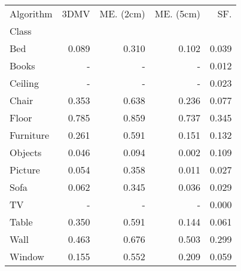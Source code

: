 \begin{tabular}{lrrrr}
\toprule
Algorithm &  3DMV &  ME. (2cm) &  ME. (5cm) &  SF. \\
Class     &       &                    &                    &                 \\
\midrule
Bed       & 0.089 &              0.310 &              0.102 &           0.039 \\
Books     &   - &                - &                - &           0.012 \\
Ceiling   &   - &                - &                - &           0.023 \\
Chair     & 0.353 &              0.638 &              0.236 &           0.077 \\
Floor     & 0.785 &              0.859 &              0.737 &           0.345 \\
Furniture & 0.261 &              0.591 &              0.151 &           0.132 \\
Objects   & 0.046 &              0.094 &              0.002 &           0.109 \\
Picture   & 0.054 &              0.358 &              0.011 &           0.027 \\
Sofa      & 0.062 &              0.345 &              0.036 &           0.029 \\
TV        &   - &                - &                - &           0.000 \\
Table     & 0.350 &              0.591 &              0.144 &           0.061 \\
Wall      & 0.463 &              0.676 &              0.503 &           0.299 \\
Window    & 0.155 &              0.552 &              0.209 &           0.059 \\
\bottomrule
\end{tabular}

